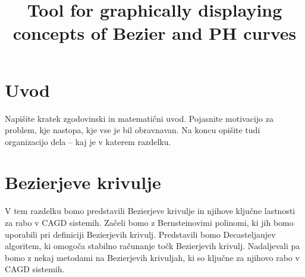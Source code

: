 \documentclass[isrm2, tisk]{fmfdelo}
\title{Tool for graphically displaying concepts of Bezier and PH curves}
\begin{document}
    \section{Uvod}
    Napišite kratek zgodovinski in matematični uvod. Pojasnite motivacijo za problem, kje
    nastopa, kje vse je bil obravnavan. Na koncu opišite tudi organizacijo dela -- kaj je v
    katerem razdelku.


    \section{Bezierjeve krivulje}\label{sec:bezierjeve-krivulje}
    V tem razdelku bomo predstavili Bezierjeve krivulje in njihove ključne lastnosti za rabo v CAGD sistemih.
    Začeli bomo z Bernsteinovimi polinomi, ki jih bomo uporabili pri definiciji Bezierjevih krivulj.
    Predstavili bomo Decasteljaujev algoritem, ki omogoča stabilno računanje točk Bezierjevih krivulj.
    Nadaljevali pa bomo z nekaj metodami na Bezierjevih krivuljah, ki so ključne za njihovo rabo v CAGD sistemih.
\end{document}
